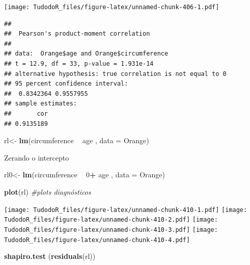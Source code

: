 \documentclass[
]{book}
\newenvironment{Shaded}{\begin{snugshade}}{\end{snugshade}}
\newcommand{\CommentTok}[1]{\textcolor[rgb]{0.56,0.35,0.01}{\textit{#1}}}
\newcommand{\DataTypeTok}[1]{\textcolor[rgb]{0.13,0.29,0.53}{#1}}
\newcommand{\DecValTok}[1]{\textcolor[rgb]{0.00,0.00,0.81}{#1}}
\newcommand{\KeywordTok}[1]{\textcolor[rgb]{0.13,0.29,0.53}{\textbf{#1}}}
\newcommand{\NormalTok}[1]{#1}
\newcommand{\OperatorTok}[1]{\textcolor[rgb]{0.81,0.36,0.00}{\textbf{#1}}}
\newcommand{\StringTok}[1]{\textcolor[rgb]{0.31,0.60,0.02}{#1}}
\begin{document}
\texttt{[image: TudodoR\_files/figure-latex/unnamed-chunk-406-1.pdf]}

\begin{Shaded}
\end{Shaded}

\begin{verbatim}
## 
##  Pearson's product-moment correlation
## 
## data:  Orange$age and Orange$circumference
## t = 12.9, df = 33, p-value = 1.931e-14
## alternative hypothesis: true correlation is not equal to 0
## 95 percent confidence interval:
##  0.8342364 0.9557955
## sample estimates:
##       cor 
## 0.9135189
\end{verbatim}

\begin{Shaded}
\begin{Highlighting}[]
\NormalTok{rl<-}\StringTok{ }\KeywordTok{lm}\NormalTok{(circumference }\OperatorTok{~}\StringTok{ }\NormalTok{age , }\DataTypeTok{data =}\NormalTok{ Orange)}
\end{Highlighting}
\end{Shaded}

Zerando o intercepto

\begin{Shaded}
\begin{Highlighting}[]
\NormalTok{rl0<-}\StringTok{ }\KeywordTok{lm}\NormalTok{(circumference }\OperatorTok{~}\StringTok{ }\DecValTok{0}\OperatorTok{+}\StringTok{ }\NormalTok{age , }\DataTypeTok{data =}\NormalTok{ Orange)}
\end{Highlighting}
\end{Shaded}

\begin{Shaded}
\begin{Highlighting}[]
\KeywordTok{plot}\NormalTok{(rl) }\CommentTok{#plots diagnósticos}
\end{Highlighting}
\end{Shaded}

\texttt{[image: TudodoR\_files/figure-latex/unnamed-chunk-410-1.pdf]} \texttt{[image: TudodoR\_files/figure-latex/unnamed-chunk-410-2.pdf]} \texttt{[image: TudodoR\_files/figure-latex/unnamed-chunk-410-3.pdf]} \texttt{[image: TudodoR\_files/figure-latex/unnamed-chunk-410-4.pdf]}

\begin{Shaded}
\begin{Highlighting}[]
\KeywordTok{shapiro.test}\NormalTok{ (}\KeywordTok{residuals}\NormalTok{(rl))}
\end{Highlighting}
\end{Shaded}
\end{document}
